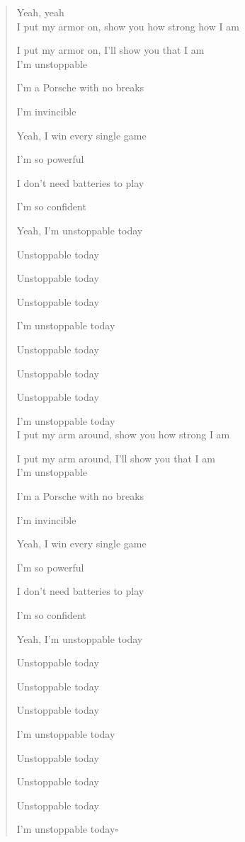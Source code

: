 \documentclass{book}
\numberwithin{equation}{section}
\begin{document}
\begin{quotation}
    Yeah, yeah
    \\
    
    I put my armor on, show you how strong how I am
    
    I put my armor on, I'll show you that I am
    \\
    
    I'm unstoppable
    
    I'm a Porsche with no breaks
    
    I'm invincible
    
    Yeah, I win every single game
    
    I'm so powerful
    
    I don't need batteries to play
    
    I'm so confident
    
    Yeah, I'm unstoppable today
    
    Unstoppable today
    
    Unstoppable today
    
    Unstoppable today
    
    I'm unstoppable today
    
    Unstoppable today
    
    Unstoppable today
    
    Unstoppable today
    
    I'm unstoppable today
    \\
    
    I put my arm around, show you how strong I am
    
    I put my arm around, I'll show you that I am
    \\
    
    I'm unstoppable
    
    I'm a Porsche with no breaks
    
    I'm invincible
    
    Yeah, I win every single game
    
    I'm so powerful
    
    I don't need batteries to play
    
    I'm so confident
    
    Yeah, I'm unstoppable today
    
    Unstoppable today
    
    Unstoppable today
    
    Unstoppable today
    
    I'm unstoppable today
    
    Unstoppable today
    
    Unstoppable today
    
    Unstoppable today
    
    I'm unstoppable today\hfill$\square$
\end{quotation}
\end{document}
